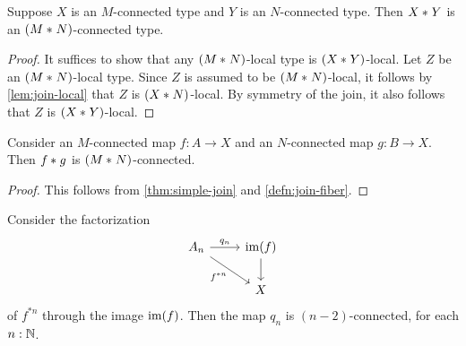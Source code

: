 \begin{thm}\label{thm:simple-join}
Suppose $X$ is an $M$-connected type and $Y$ is an $N$-connected type. Then ${X}\ast_{}{Y}$ is an $({M}\ast_{}{N})$-connected type.
\end{thm}

\begin{proof}
It suffices to show that any $({M}\ast_{}{N})$-local type is $({X}\ast_{}{Y})$-local.
Let $Z$ be an $({M}\ast_{}{N})$-local type.
Since $Z$ is assumed to be $({M}\ast_{}{N})$-local, it follows by \autoref{lem:join-local} that $Z$ is $({X}\ast_{}{N})$-local. By symmetry of the join, it also follows that $Z$ is $({X}\ast_{}{Y})$-local.
\end{proof}

\begin{thm}\label{thm:join-connectivity}
Consider an $M$-connected map $f:A\to X$ and an $N$-connected map $g:B\to X$. Then ${f}\ast_{}{g}$ is $({M}\ast_{}{N})$-connected.
\end{thm}

\begin{proof}
This follows from \autoref{thm:simple-join} and \autoref{defn:join-fiber}.
\end{proof}

\begin{thm}\label{thm:joinconstruction-connectivity}
Consider the factorization
\begin{equation*}
\begin{tikzcd}
A_n \arrow[dr,swap,"f^{\ast n}"] \arrow[r,"q_n"] & \im(f) \arrow[d] \\
& X
\end{tikzcd}
\end{equation*}
of $f^{\ast n}$ through the image $\operatorname{im}(f)$. 
Then the map $q_n$ is $(n-2)$-connected, for each $n:\mathbb{N}$.
\end{thm}

